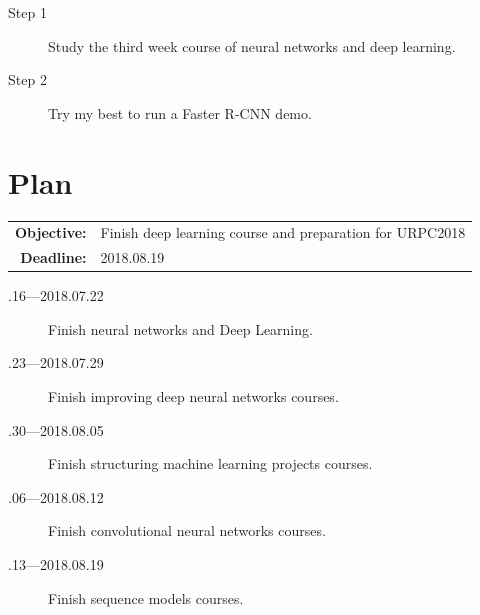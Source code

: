 \documentclass[a4paper]{article}
\begin{document}
\begin{description}
	\item [Step 1] Study the third week course of neural networks and deep learning.
	\item[Step 2] Try my best to run a Faster R-CNN demo.\label{t1}
\end{description}

\section{Plan}

\begin{tabular}{rl}
	\textbf{Objective:} & Finish deep learning course and preparation for URPC2018 \\
	\textbf{Deadline:} & 2018.08.19
\end{tabular}

\begin{description}
	\item[.16---2018.07.22] Finish neural networks and Deep Learning.
	\item[.23---2018.07.29] Finish improving deep neural networks courses.
	\item[.30---2018.08.05] Finish structuring machine learning projects courses.
	\item[.06---2018.08.12] Finish convolutional neural networks courses.
	\item[.13---2018.08.19] Finish sequence models courses.
\end{description}





\end{document}
